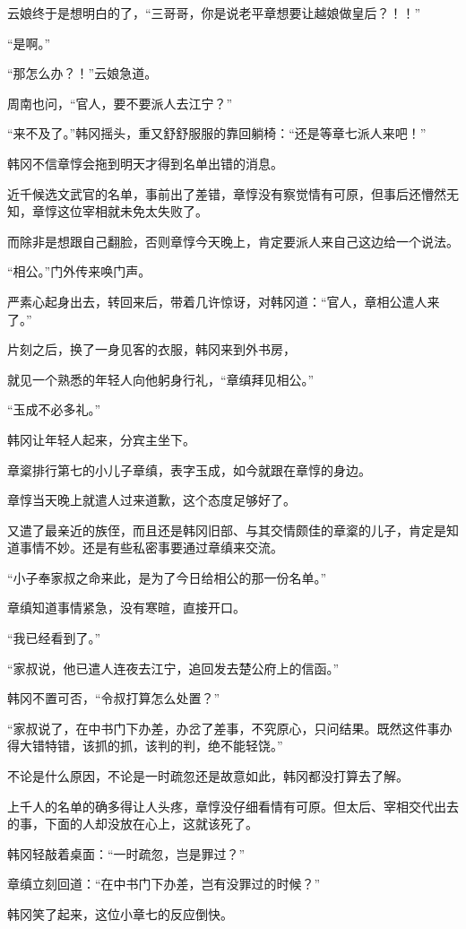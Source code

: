 云娘终于是想明白的了，“三哥哥，你是说老平章想要让越娘做皇后？！！”

“是啊。”

“那怎么办？！”云娘急道。

周南也问，“官人，要不要派人去江宁？”

“来不及了。”韩冈摇头，重又舒舒服服的靠回躺椅：“还是等章七派人来吧！”

韩冈不信章惇会拖到明天才得到名单出错的消息。

近千候选文武官的名单，事前出了差错，章惇没有察觉情有可原，但事后还懵然无知，章惇这位宰相就未免太失败了。

而除非是想跟自己翻脸，否则章惇今天晚上，肯定要派人来自己这边给一个说法。

“相公。”门外传来唤门声。

严素心起身出去，转回来后，带着几许惊讶，对韩冈道：“官人，章相公遣人来了。”

片刻之后，换了一身见客的衣服，韩冈来到外书房，

就见一个熟悉的年轻人向他躬身行礼，“章缜拜见相公。”

“玉成不必多礼。”

韩冈让年轻人起来，分宾主坐下。

章楶排行第七的小儿子章缜，表字玉成，如今就跟在章惇的身边。

章惇当天晚上就遣人过来道歉，这个态度足够好了。

又遣了最亲近的族侄，而且还是韩冈旧部、与其交情颇佳的章楶的儿子，肯定是知道事情不妙。还是有些私密事要通过章缜来交流。

“小子奉家叔之命来此，是为了今日给相公的那一份名单。”

章缜知道事情紧急，没有寒暄，直接开口。

“我已经看到了。”

“家叔说，他已遣人连夜去江宁，追回发去楚公府上的信函。”

韩冈不置可否，“令叔打算怎么处置？”

“家叔说了，在中书门下办差，办岔了差事，不究原心，只问结果。既然这件事办得大错特错，该抓的抓，该判的判，绝不能轻饶。”

不论是什么原因，不论是一时疏忽还是故意如此，韩冈都没打算去了解。

上千人的名单的确多得让人头疼，章惇没仔细看情有可原。但太后、宰相交代出去的事，下面的人却没放在心上，这就该死了。

韩冈轻敲着桌面：“一时疏忽，岂是罪过？”

章缜立刻回道：“在中书门下办差，岂有没罪过的时候？”

韩冈笑了起来，这位小章七的反应倒快。

